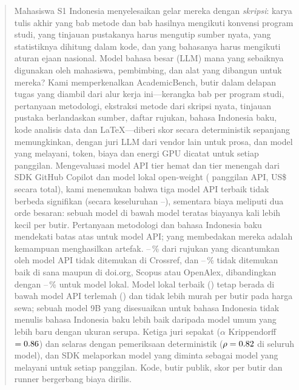 \begin{abstract}
Mahasiswa S1 Indonesia menyelesaikan gelar mereka dengan \emph{skripsi}: karya tulis akhir yang bab metode dan bab hasilnya mengikuti konvensi program studi, yang tinjauan pustakanya harus mengutip sumber nyata, yang statistiknya dihitung dalam kode, dan yang bahasanya harus mengikuti aturan ejaan nasional. Model bahasa besar (LLM) mana yang sebaiknya digunakan oleh mahasiswa, pembimbing, dan alat yang dibangun untuk mereka? Kami memperkenalkan AcademicBench, \NItems{} butir dalam delapan tugas yang diambil dari alur kerja ini---kerangka bab per program studi, pertanyaan metodologi, ekstraksi metode dari skripsi nyata, tinjauan pustaka berlandaskan sumber, daftar rujukan, bahasa Indonesia baku, kode analisis data dan LaTeX---diberi skor secara deterministik sepanjang memungkinkan, dengan juri LLM dari vendor lain untuk prosa, dan model yang melayani, token, biaya dan energi GPU dicatat untuk setiap panggilan. Mengevaluasi \NApi{} model API tier hemat dan tier menengah dari SDK GitHub Copilot dan \NLocal{} model lokal open-weight (\NApiCalls{} panggilan API, US\$\StudyUSD{} secara total), kami menemukan bahwa tiga model API terbaik tidak berbeda signifikan (secara keseluruhan \ThirdScore{}--\TopScore{}), sementara biaya meliputi dua orde besaran: sebuah model \CheapGap{} di bawah model teratas biayanya \CostRatio{} kali lebih kecil per butir. Pertanyaan metodologi dan bahasa Indonesia baku mendekati batas atas untuk model API; yang membedakan mereka adalah kemampuan menghasilkan artefak. \HalApiMin{}--\HalApiMax{}\,\% dari rujukan yang dicantumkan oleh model API tidak ditemukan di Crossref, dan \NoneApiMin{}--\NoneApiMax{}\,\% tidak ditemukan baik di sana maupun di doi.org, Scopus atau OpenAlex, dibandingkan dengan \NoneLocMin{}--\NoneLocMax{}\,\% untuk model lokal. Model lokal terbaik (\BestLocalScore{}) tetap berada di bawah model API terlemah (\WorstApiScore{}) dan tidak lebih murah per butir pada harga sewa; sebuah model 9B yang disesuaikan untuk bahasa Indonesia tidak menulis bahasa Indonesia baku lebih baik daripada model umum yang lebih baru dengan ukuran serupa. Ketiga juri sepakat ($\alpha$ Krippendorff $=\AlphaJudges{}$) dan selaras dengan pemeriksaan deterministik ($\rho=\RhoModelGrd{}$ di seluruh model), dan SDK melaporkan model yang diminta sebagai model yang melayani untuk setiap panggilan. Kode, butir publik, skor per butir dan runner bergerbang biaya dirilis.
\end{abstract}
